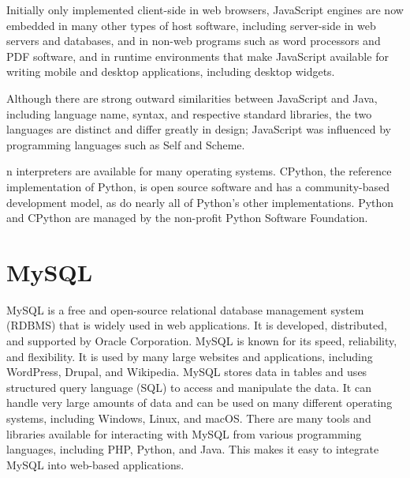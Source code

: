 Initially only implemented client-side in web browsers, JavaScript engines are now embedded in many other types of host software, including server-side in web servers and databases, and in non-web programs such as word processors and PDF software, and in runtime environments that make JavaScript available for writing mobile and desktop applications, including desktop widgets.

Although there are strong outward similarities between JavaScript and Java, including language name, syntax, and respective standard libraries, the two languages are distinct and differ greatly in design; JavaScript was influenced by programming languages such as Self and Scheme.

n interpreters are available for many operating systems. CPython, the reference implementation of Python, is open source software and has a community-based development model, as do nearly all of Python's other implementations. Python and CPython are managed by the non-profit Python Software Foundation. 

\section{MySQL}
MySQL is a free and open-source relational database management system (RDBMS) that is widely used in web applications. It is developed, distributed, and supported by Oracle Corporation.
MySQL is known for its speed, reliability, and flexibility. It is used by many large websites and applications, including WordPress, Drupal, and Wikipedia.
MySQL stores data in tables and uses structured query language (SQL) to access and manipulate the data. It can handle very large amounts of data and can be used on many different operating systems, including Windows, Linux, and macOS.
There are many tools and libraries available for interacting with MySQL from various programming languages, including PHP, Python, and Java. This makes it easy to integrate MySQL into web-based applications.


